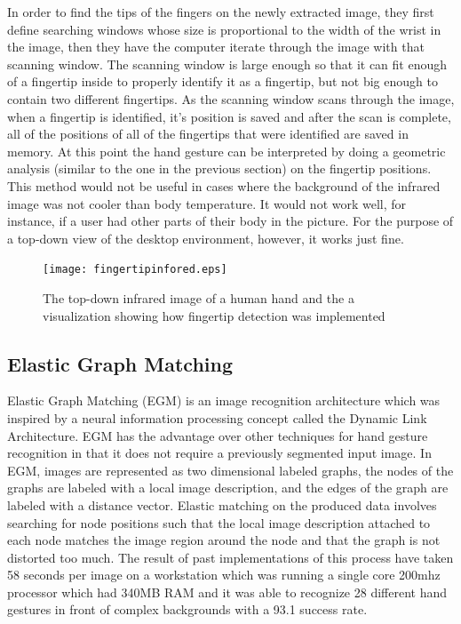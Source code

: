\documentclass[a4paper,12pt]{report}
\begin{document}
In order to find the tips of the fingers on the newly extracted image, they first define searching windows whose size is proportional to the width of the wrist in the image, then they have the computer iterate through the image with that scanning window. The scanning window is large enough so that it can fit enough of a fingertip inside to properly identify it as a fingertip, but not big enough to contain two different fingertips. As the scanning window scans through the image, when a fingertip is identified, it's position is saved and after the scan is complete, all of the positions of all of the fingertips that were identified are saved in memory. At this point the hand gesture can be interpreted by doing a geometric analysis (similar to the one in the previous section) on the fingertip positions. This method would not be useful in cases where the background of the infrared image was not cooler than body temperature. It would not work well, for instance, if a user had other parts of their body in the picture. For the purpose of a top-down view of the desktop environment, however, it works just fine.

\begin{figure}
 \centering
\texttt{[image: fingertipinfored.eps]}
\caption{The top-down infrared image of a human hand and the a visualization showing how fingertip detection was implemented}
\end{figure}


\subsection{Elastic Graph Matching}

Elastic Graph Matching (EGM) \cite{egm} is an image recognition architecture which was inspired by a neural information processing concept called the Dynamic Link Architecture\cite{dla}. EGM has the advantage over other techniques for hand gesture recognition in that it does not require a previously segmented input image. In EGM, images are represented as two dimensional labeled graphs, the nodes of the graphs are labeled with a local image description, and the edges of the graph are labeled with a distance vector. Elastic matching on the produced data involves searching for node positions such that the local image description attached to each node matches the image region around the node and that the graph is not distorted too much\cite{egm}. The result of past implementations of this process have taken 58 seconds per image on a workstation which was running a single core 200mhz processor which had 340MB RAM and it was able to recognize 28 different hand gestures in front of complex backgrounds with a 93.1 success rate.
\end{document}
